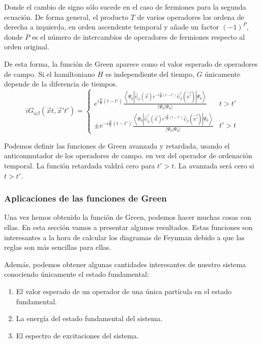 \documentclass[12pt,twoside]{article}
\begin{document}
Donde el cambio de signo sólo sucede en el caso de fermiones para la segunda ecuación. De forma general, el producto $T$ de varios operadores los ordena de derecha a izquierda, en orden ascendente temporal y añade un factor $(-1)^P$, donde $P$ es el número de intercambios de operadores de fermiones respecto al orden original.

De esta forma, la función de Green aparece como el valor esperado de operadores de campo. Si el hamiltoniano $\hat{H}$ es independiente del tiempo, $G$ únicamente depende de la diferencia de tiempos.
$$
iG_{\alpha\beta}(\vec{x}t, \vec{x}'t') = \left\{\begin{array}{cc}
    e^{i\frac{E}{\hbar}(t-t')}\frac{\left\langle\Psi_0\left|\hat{\psi}_{\alpha}(\vec{x})e^{-i\frac{\hat{H}}{\hbar}(t-t')}\hat{\psi}^{\dagger}_{\beta}(\vec{x'})\right|\Psi_0\right\rangle}{\langle\Psi_0|\Psi_0\rangle} & t>t' \\
    \pm e^{-i\frac{E}{\hbar}(t-t')}\frac{\left\langle\Psi_0\left|\hat{\psi}^{\dagger}_{\alpha}(\vec{x})e^{i\frac{\hat{H}}{\hbar}(t-t')}\hat{\psi}_{\beta}(\vec{x'})\right|\Psi_0\right\rangle}{\langle\Psi_0|\Psi_0\rangle} & t'>t
\end{array}\right.
$$

Podemos definir las funciones de Green avanzada y retardada, usando el anticonmutador de los operadores de campo. en vez del operador de ordenación temporal. La función retardada valdrá cero para $t' > t$. La avanzada será cero si $t > t'$.
\subsubsection{Aplicaciones de las funciones de Green}

Una vez hemos obtenido la función de Green, podemos hacer muchas cosas con ellas. En esta sección vamos a presentar algunos resultados. Estas funciones son interesantes a la hora de calcular los diagramas de Feynman debido a que las reglas son más sencillas para ellas.

Además, podemos obtener algunas cantidades interesantes de nuestro sistema conociendo únicamente el estado fundamental:
\begin{enumerate}
  \item El valor esperado de un operador de una única partícula en el estado fundamental.
  \item La energía del estado fundamental del sistema.
  \item El espectro de excitaciones del sistema.
\end{enumerate}
\end{document}
